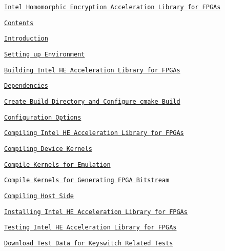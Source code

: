 \begin{DoxyItemize}
\item \href{#intel-homomorphic-encryption-acceleration-library-for-fpgas}{\tt Intel Homomorphic Encryption Acceleration Library for F\-P\-G\-As}
\begin{DoxyItemize}
\item \href{#contents}{\tt Contents}
\item \href{#introduction}{\tt Introduction}
\item \href{#setting-up-environment}{\tt Setting up Environment}
\item \href{#building-intel-he-acceleration-library-for-fpgas}{\tt Building Intel H\-E Acceleration Library for F\-P\-G\-As}
\begin{DoxyItemize}
\item \href{#dependencies}{\tt Dependencies}
\item \href{#create-build-directory-and-configure-cmake-build}{\tt Create Build Directory and Configure cmake Build}
\begin{DoxyItemize}
\item \href{#configuration-options}{\tt Configuration Options}
\end{DoxyItemize}
\item \href{#compiling-intel-he-acceleration-library-for-fpgas}{\tt Compiling Intel H\-E Acceleration Library for F\-P\-G\-As}
\begin{DoxyItemize}
\item \href{#compiling-device-kernels}{\tt Compiling Device Kernels}
\begin{DoxyItemize}
\item \href{#compile-kernels-for-emulation}{\tt Compile Kernels for Emulation}
\item \href{#compile-kernels-for-generating-fpga-bitstream}{\tt Compile Kernels for Generating F\-P\-G\-A Bitstream}
\end{DoxyItemize}
\item \href{#compiling-host-side}{\tt Compiling Host Side}
\end{DoxyItemize}
\end{DoxyItemize}
\item \href{#installing-intel-he-acceleration-library-for-fpgas}{\tt Installing Intel H\-E Acceleration Library for F\-P\-G\-As}
\item \href{#testing-intel-he-acceleration-library-for-fpgas}{\tt Testing Intel H\-E Acceleration Library for F\-P\-G\-As}
\begin{DoxyItemize}
\item \href{#download-test-data-for-keyswitch-related-tests}{\tt Download Test Data for Keyswitch Related Tests}

\end{DoxyItemize}
\end{DoxyItemize}
\end{DoxyItemize}
